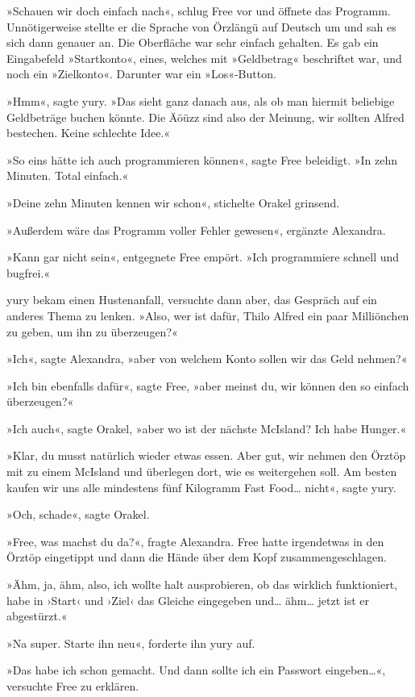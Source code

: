 »Schauen wir doch einfach nach«, schlug Free vor und öffnete das Programm. Unnötigerweise stellte er die Sprache von Örzlängü auf Deutsch um und sah es sich dann genauer an. Die Oberfläche war sehr einfach gehalten. Es gab ein Eingabefeld »Startkonto«, eines, welches mit »Geldbetrag« beschriftet war, und noch ein »Zielkonto«. Darunter war ein »Los«-Button.

»Hmm«, sagte yury. »Das sieht ganz danach aus, als ob man hiermit beliebige Geldbeträge buchen könnte. Die Äöüzz sind also der Meinung, wir sollten Alfred bestechen. Keine schlechte Idee.«

»So eins hätte ich auch programmieren können«, sagte Free beleidigt. »In zehn Minuten. Total einfach.«

»Deine zehn Minuten kennen wir schon«, stichelte Orakel grinsend.

»Außerdem wäre das Programm voller Fehler gewesen«, ergänzte Alexandra.

»Kann gar nicht sein«, entgegnete Free empört. »Ich programmiere schnell und bugfrei.«

yury bekam einen Hustenanfall, versuchte dann aber, das Gespräch auf ein anderes Thema zu lenken. »Also, wer ist dafür, Thilo Alfred ein paar Milliönchen zu geben, um ihn zu überzeugen?«

»Ich«, sagte Alexandra, »aber von welchem Konto sollen wir das Geld nehmen?«

»Ich bin ebenfalls dafür«, sagte Free, »aber meinst du, wir können den so einfach überzeugen?«

»Ich auch«, sagte Orakel, »aber wo ist der nächste McIsland? Ich habe Hunger.«

»Klar, du musst natürlich wieder etwas essen. Aber gut, wir nehmen den Örztöp mit zu einem McIsland und überlegen dort, wie es weitergehen soll. Am besten kaufen wir uns alle mindestens fünf Kilogramm Fast Food… nicht«, sagte yury.

»Och, schade«, sagte Orakel.

»Free, was machst du da?«, fragte Alexandra. Free hatte irgendetwas in den Örztöp eingetippt und dann die Hände über dem Kopf zusammengeschlagen.

»Ähm, ja, ähm, also, ich wollte halt ausprobieren, ob das wirklich funktioniert, habe in ›Start‹ und ›Ziel‹ das Gleiche eingegeben und… ähm… jetzt ist er abgestürzt.«

»Na super. Starte ihn neu«, forderte ihn yury auf.

»Das habe ich schon gemacht. Und dann sollte ich ein Passwort eingeben…«, versuchte Free zu erklären.

